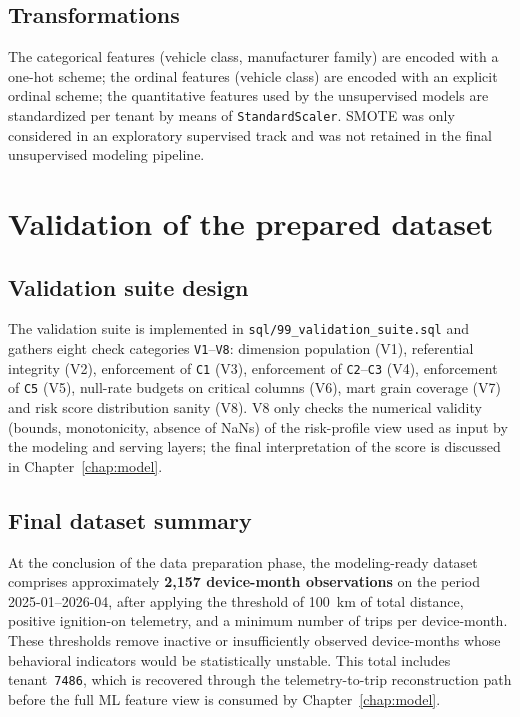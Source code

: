 \subsection{Transformations}
The categorical features (vehicle class, manufacturer family) are encoded with a one-hot scheme; the ordinal features (vehicle class) are encoded with an explicit ordinal scheme; the quantitative features used by the unsupervised models are standardized per tenant by means of \texttt{StandardScaler}. SMOTE was only considered in an exploratory supervised track and was not retained in the final unsupervised modeling pipeline.

\section{Validation of the prepared dataset}

\subsection{Validation suite design}
The validation suite is implemented in \texttt{sql/99\_validation\_suite.sql} and gathers eight check categories \texttt{V1}--\texttt{V8}: dimension population (V1), referential integrity (V2), enforcement of \texttt{C1} (V3), enforcement of \texttt{C2}--\texttt{C3} (V4), enforcement of \texttt{C5} (V5), null-rate budgets on critical columns (V6), mart grain coverage (V7) and risk score distribution sanity (V8). V8 only checks the numerical validity (bounds, monotonicity, absence of NaNs) of the risk-profile view used as input by the modeling and serving layers; the final interpretation of the score is discussed in Chapter~\ref{chap:model}.

\subsection{Final dataset summary}
At the conclusion of the data preparation phase, the modeling-ready dataset comprises approximately \textbf{2{,}157 device-month observations} on the period 2025-01--2026-04, after applying the threshold of 100~km of total distance, positive ignition-on telemetry, and a minimum number of trips per device-month. These thresholds remove inactive or insufficiently observed device-months whose behavioral indicators would be statistically unstable. This total includes tenant~\texttt{7486}, which is recovered through the telemetry-to-trip reconstruction path before the full ML feature view is consumed by Chapter~\ref{chap:model}.


